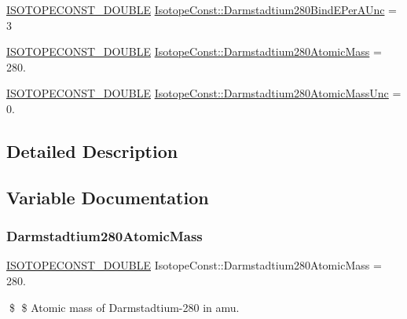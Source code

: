 \begin{DoxyCompactItemize}
\item 
\mbox{\hyperlink{group___isotope_const-_macros_ga8f45a7272ce02c0b4c65c44636ed719a}{I\+S\+O\+T\+O\+P\+E\+C\+O\+N\+S\+T\+\_\+\+D\+O\+U\+B\+LE}} \mbox{\hyperlink{group___isotope_const-_darmstadtium-_ds280_ga1c0b60597afae947e1ed4971a671e9d1}{Isotope\+Const\+::\+Darmstadtium280\+Bind\+E\+Per\+A\+Unc}} = 3
\item 
\mbox{\hyperlink{group___isotope_const-_macros_ga8f45a7272ce02c0b4c65c44636ed719a}{I\+S\+O\+T\+O\+P\+E\+C\+O\+N\+S\+T\+\_\+\+D\+O\+U\+B\+LE}} \mbox{\hyperlink{group___isotope_const-_darmstadtium-_ds280_gad8bb00b4d084164f9cdfaa04c5bc93ba}{Isotope\+Const\+::\+Darmstadtium280\+Atomic\+Mass}} = 280.
\item 
\mbox{\hyperlink{group___isotope_const-_macros_ga8f45a7272ce02c0b4c65c44636ed719a}{I\+S\+O\+T\+O\+P\+E\+C\+O\+N\+S\+T\+\_\+\+D\+O\+U\+B\+LE}} \mbox{\hyperlink{group___isotope_const-_darmstadtium-_ds280_ga40421070e5d62e2963d54574dc9930ef}{Isotope\+Const\+::\+Darmstadtium280\+Atomic\+Mass\+Unc}} = 0.
\end{DoxyCompactItemize}


\subsection{Detailed Description}


\subsection{Variable Documentation}
\mbox{\label{group___isotope_const-_darmstadtium-_ds280_gad8bb00b4d084164f9cdfaa04c5bc93ba}} 
\subsubsection{\texorpdfstring{Darmstadtium280\+Atomic\+Mass}{Darmstadtium280AtomicMass}}
{\footnotesize\ttfamily \mbox{\hyperlink{group___isotope_const-_macros_ga8f45a7272ce02c0b4c65c44636ed719a}{I\+S\+O\+T\+O\+P\+E\+C\+O\+N\+S\+T\+\_\+\+D\+O\+U\+B\+LE}} Isotope\+Const\+::\+Darmstadtium280\+Atomic\+Mass = 280.}

\$ \$ Atomic mass of Darmstadtium-\/280 in amu. \mbox{\label{group___isotope_const-_darmstadtium-_ds280_ga40421070e5d62e2963d54574dc9930ef}} 
